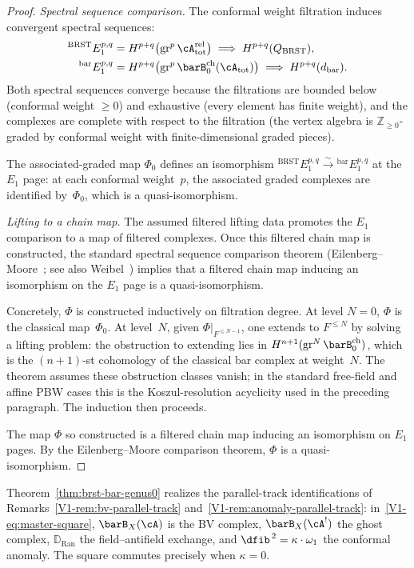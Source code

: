 \begin{proof}
\emph{Spectral sequence comparison.}
The conformal weight filtration induces convergent spectral sequences:
\begin{align}
{}^{\mathrm{BRST}}E_1^{p,q}
 &= H^{p+q}\bigl(\mathrm{gr}^p\, \cA_{\mathrm{tot}}^{\mathrm{rel}}\bigr)
 \;\Longrightarrow\;
 H^{p+q}(Q_{\mathrm{BRST}}), \\
{}^{\mathrm{bar}}E_1^{p,q}
 &= H^{p+q}\bigl(\mathrm{gr}^p\, \barB^{\mathrm{ch}}_0(\cA_{\mathrm{tot}})\bigr)
 \;\Longrightarrow\;
 H^{p+q}(d_{\mathrm{bar}}).
\end{align}
Both spectral sequences converge because the filtrations are bounded
below (conformal weight $\geq 0$) and exhaustive (every element has
finite weight), and the complexes are complete with respect to the
filtration (the vertex algebra is $\mathbb{Z}_{\geq 0}$-graded by
conformal weight with finite-dimensional graded pieces).

The associated-graded map $\Phi_0$ defines an isomorphism
${}^{\mathrm{BRST}}E_1^{p,q} \xrightarrow{\sim}
{}^{\mathrm{bar}}E_1^{p,q}$ at the $E_1$ page: at each conformal
weight~$p$, the associated graded complexes are identified by~$\Phi_0$,
which is a quasi-isomorphism.

\emph{Lifting to a chain map.}
The assumed filtered lifting data promotes the $E_1$ comparison to a
map of filtered complexes. Once this filtered chain map is constructed,
the standard spectral sequence comparison theorem
(Eilenberg--Moore~\cite{EM66}; see also
Weibel~\cite[Theorem~5.2.12]{Weibel94}) implies that a filtered chain
map inducing an isomorphism on the $E_1$ page is a quasi-isomorphism.

Concretely, $\Phi$ is constructed inductively on filtration degree.
At level $N = 0$, $\Phi$ is the classical map~$\Phi_0$. At level~$N$,
given $\Phi|_{F^{\leq N-1}}$, one extends to $F^{\leq N}$ by solving
a lifting problem: the obstruction to extending lies in
$H^{n+1}(\mathrm{gr}^N\,\barB^{\mathrm{ch}}_0)$, which is the
$(n+1)$-st cohomology of the classical bar complex at weight~$N$.
The theorem assumes these obstruction classes vanish; in the standard
free-field and affine PBW cases this is the Koszul-resolution acyclicity
used in the preceding paragraph. The induction then proceeds.

The map $\Phi$ so constructed is a filtered chain map inducing an
isomorphism on $E_1$ pages. By the Eilenberg--Moore comparison
theorem, $\Phi$ is a quasi-isomorphism.
\end{proof}

\begin{remark}
\label{rem:bv-convergence}
Theorem~\ref{thm:brst-bar-genus0} realizes the parallel-track identifications of Remarks~\ref{V1-rem:bv-parallel-track} and~\ref{V1-rem:anomaly-parallel-track}: in~\eqref{V1-eq:master-square}, $\barB_X(\cA)$ is the BV complex, $\barB_X(\cA^!)$ the ghost complex, $\mathbb{D}_{\mathrm{Ran}}$ the field--antifield exchange, and $\dfib^{\,2} = \kappa \cdot \omega_1$ the conformal anomaly. The square commutes precisely when $\kappa = 0$.
\end{remark}

